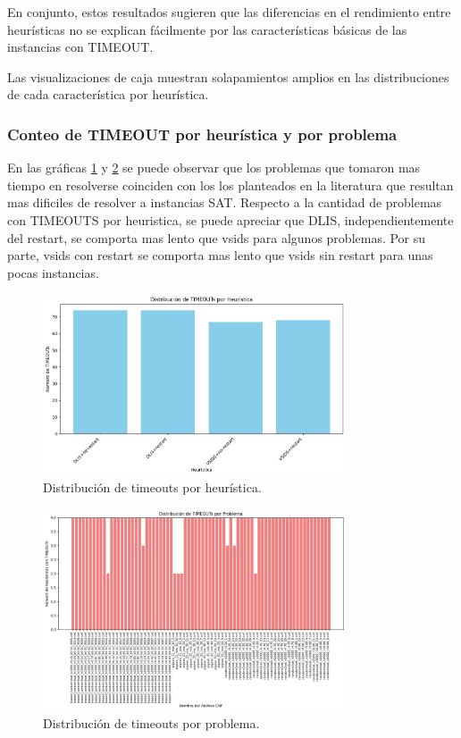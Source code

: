 En conjunto, estos resultados sugieren que las diferencias en el rendimiento entre heurísticas no se explican fácilmente por las características básicas de las instancias con TIMEOUT.

Las visualizaciones de caja muestran solapamientos amplios en las distribuciones de cada caracter\'istica por heur\'istica.

\subsubsection{Conteo de TIMEOUT por heur\'istica y por problema}

En las gr\'aficas \ref{fig:timeouts-x-heuristica} y \ref{fig:timeouts-x-problema} se puede observar que los problemas que tomaron mas tiempo en resolverse coinciden con los los planteados en la literatura que resultan mas dificiles de resolver a instancias SAT. Respecto a la cantidad de problemas con TIMEOUTS por heuristica, se puede apreciar que DLIS, independientemente del restart, se comporta mas lento que vsids para algunos problemas. Por su parte, vsids con restart se comporta mas lento que vsids sin restart para unas pocas instancias.

\begin{figure}[ht]
    \centering
    \includegraphics[width=0.8\textwidth]{Graphics/timeouts_x_heuristica.png}
    \caption{Distribuci\'on de timeouts por heur\'istica.}
    \label{fig:timeouts-x-heuristica}
\end{figure}

\begin{figure}[ht]
    \centering
    \includegraphics[width=0.8\textwidth]{Graphics/timeouts_x_problema.png}
    \caption{Distribuci\'on de timeouts por problema.}
    \label{fig:timeouts-x-problema}
\end{figure}

